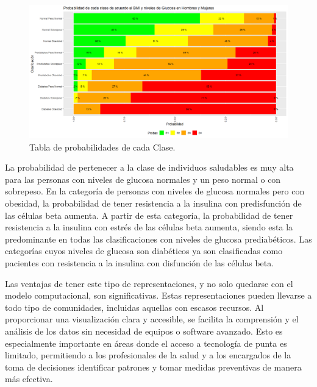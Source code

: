 \begin{figure}[H]

    \centering
    \includegraphics[height = 10 cm, width = 0.99 \textwidth]{4img/tablaT.png}
    \caption{Tabla de probabilidades de cada Clase.}
    \label{fig:tabla4varTotal}
\end{figure}

La probabilidad de pertenecer a la clase de individuos saludables es muy alta para las personas con niveles de glucosa normales y un peso normal o con sobrepeso. En la categoría de personas con niveles de glucosa normales pero con obesidad, la probabilidad de tener resistencia a la insulina con predisfunción de las células beta aumenta. A partir de esta categoría, la probabilidad de tener resistencia a la insulina con estrés de las células beta aumenta, siendo esta la predominante en todas las clasificaciones con niveles de glucosa prediabéticos. Las categorías cuyos niveles de glucosa son diabéticos ya son clasificadas como pacientes con resistencia a la insulina con disfunción de las células beta.

Las ventajas de tener este tipo de representaciones, y no solo quedarse con el modelo computacional, son significativas. Estas representaciones pueden llevarse a todo tipo de comunidades, incluidas aquellas con escasos recursos. Al proporcionar una visualización clara y accesible, se facilita la comprensión y el análisis de los datos sin necesidad de equipos o software avanzado. Esto es especialmente importante en áreas donde el acceso a tecnología de punta es limitado, permitiendo a los profesionales de la salud y a los encargados de la toma de decisiones identificar patrones y tomar medidas preventivas de manera más efectiva.

